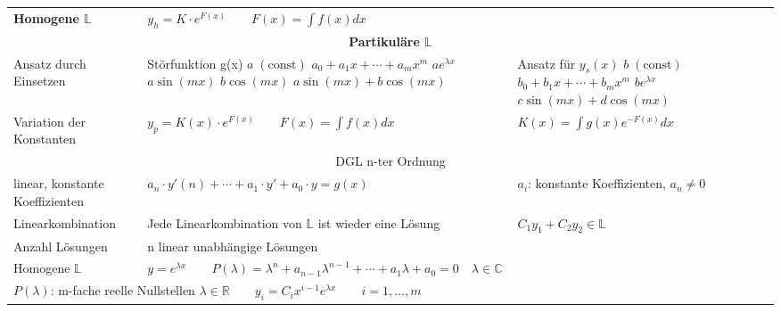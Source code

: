 \begin{tabularx}{\columnwidth}{p{2.8cm}XX}
	\textbf{Homogene $\mathbb{L}$} & $y_h = K\cdot e^{F(x)} \qquad F(x) = \int f(x)dx$ & \\
	\multicolumn{3}{c}{\textbf{Partikuläre $\mathbb{L}$}}\\				
	\cline{2-3}
	Ansatz durch Einsetzen &  
	Störfunktion g(x)\newline 
	$a\;(\text{const})$\newline 
	$a_0 + a_1x +\cdots +a_mx^m$\newline
	$ae^{\lambda x}$\newline
	$a\sin(mx)$\newline 
	$b\cos(mx)$\newline 
	$a\sin(mx) + b\cos(mx)$&
	Ansatz für $y_s(x)$  \newline 
	$b\;(\text{const})$ \newline 
	$b_0 + b_1x + \cdots + b_mx^m$\newline 	
	$be^{\lambda x}$\newline 			 
	$c\sin(mx) + d\cos(mx)$\\
	\cline{2-3}
	Variation \newline der Konstanten & $y_p = K(x)\cdot e^{F(x)} \qquad F(x) = \int f(x)dx$ & $K(x) = \int g(x)e^{-F(x)}dx$\\
	\hline
	\multicolumn{3}{c}{DGL n-ter Ordnung}\\
	\hdashline 
	linear, konstante Koeffizienten & $a_n\cdot y'(n) + \cdots + a_1\cdot y' + a_0\cdot y = g(x)$  & $a_i$: konstante Koeffizienten, $a_n\neq 0$\\
	Linearkombination & Jede Linearkombination von $\mathbb{L}$ ist wieder eine Lösung & $C_1y_1 + C_2 y_2 \in \mathbb L$\\
	Anzahl Lösungen & n linear unabhängige Lösungen & \\
	Homogene $\mathbb{L}$ & \multicolumn{2}{p{14cm}}{ $y = e^{\lambda x} \qquad P(\lambda) = \lambda^n +a_{n-1}\lambda^{n-1} + \cdots + a_1\lambda + a_0 = 0 \quad \lambda\in\mathbb{C}$}\\
	
	\multicolumn{3}{p{\columnwidth}}{$P(\lambda)$: m-fache reelle Nullstellen  $\lambda\in\mathbb{R} \qquad y_i=C_i x^{i-1}e^{\lambda x} \qquad  i=1, \dots,m$}\\
	

\end{tabularx}
